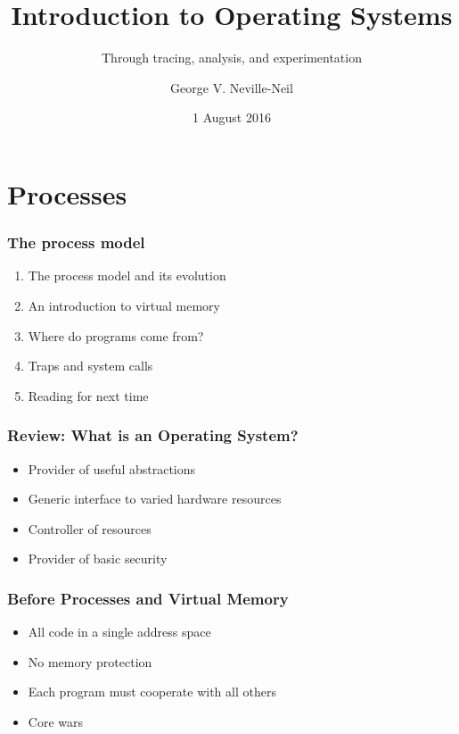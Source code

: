 \documentclass[pdftex]{beamer} %
\begin{document}

\title{Introduction to Operating Systems}
\subtitle{Through tracing, analysis, and experimentation}
\author{George V. Neville-Neil}
\date{1 August 2016}

\begin{frame}
  \titlepage
\end{frame}

\section{Processes}
\label{sec:processes}

\begin{frame}
  \frametitle{The process model}

  \begin{enumerate}
    \item The process model and its evolution
    \item An introduction to virtual memory
    \item Where do programs come from?
    \item Traps and system calls
    \item Reading for next time
  \end{enumerate}
\end{frame}

\begin{frame}
  \frametitle{Review: What is an Operating System?}
  \begin{itemize}
  \item Provider of useful abstractions
  \item Generic interface to varied hardware resources
  \item Controller of resources
  \item Provider of basic security
  \end{itemize}
\end{frame}

\begin{frame}
  \frametitle{Before Processes and Virtual Memory}
  \begin{itemize}
  \item All code in a single address space
  \item No memory protection
  \item Each program must cooperate with all others
  \item Core wars
  \end{itemize}
\end{frame}
\end{document}
